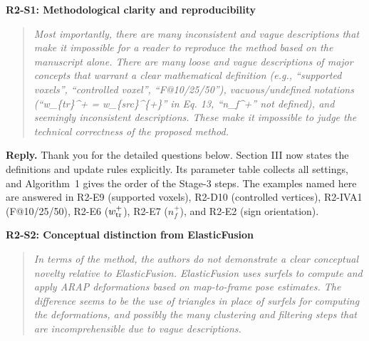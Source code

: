 \documentclass[11pt,a4paper]{article}
\newcommand{\point}[2]{\par\medskip\textbf{#1}\par\begin{quote}\itshape #2\end{quote}}
\newenvironment{reply}{\begingroup\color{replyblue}\textbf{Reply.} }{\par\endgroup}
\begin{document}
\point{R2-S1: Methodological clarity and reproducibility}{Most importantly, there are many inconsistent and vague descriptions that make it impossible for a reader to reproduce the method based on the manuscript alone. There are many loose and vague descriptions of major concepts that warrant a clear mathematical definition (e.g., ``supported voxels'', ``controlled voxel'', ``F@10/25/50''), vacuous/undefined notations (``w\_\{tr\}\textasciicircum{}+ = w\_\{src\}\textasciicircum{}\{+\}'' in Eq. 13, ``n\_f\textasciicircum{}+'' not defined), and seemingly inconsistent descriptions. These make it impossible to judge the technical correctness of the proposed method.}
\begin{reply}
Thank you for the detailed questions below. Section III now states the definitions and update rules explicitly. Its parameter table collects all settings, and Algorithm~1 gives the order of the Stage-3 steps. The examples named here are answered in R2-E9 (supported voxels), R2-D10 (controlled vertices), R2-IVA1 (F@10/25/50), R2-E6 ($w_{\rm tr}^+$), R2-E7 ($n_f^+$), and R2-E2 (sign orientation).
\end{reply}
\point{R2-S2: Conceptual distinction from ElasticFusion}{In terms of the method, the authors do not demonstrate a clear conceptual novelty relative to ElasticFusion. ElasticFusion uses surfels to compute and apply ARAP deformations based on map-to-frame pose estimates. The difference seems to be the use of triangles in place of surfels for computing the deformations, and possibly the many clustering and filtering steps that are incomprehensible due to vague descriptions.}
\end{document}
